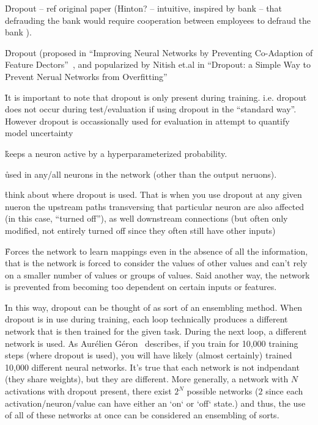 \r{Dropout -- ref original paper (Hinton? -- intuitive, inspired by bank -- that defrauding the bank would require cooperation between employees to defraud the bank )}.

\r{Dropout (proposed in ``Improving Neural Networks by Preventing Co-Adaption of Feature Dectors''~\cite{DBLP:journals/corr/abs-1207-0580}, and popularized by Nitish et.al in ``Dropout: a Simple Way to Prevent Nerual Networks from Overfitting''~\cite{JMLR:v15:srivastava14a}}

\r{It is important to note that dropout is only present during training. i.e. dropout does not occur during test/evaluation if using dropout in the ``standard way''. However dropout is occassionally used for evaluation in attempt to quantify model uncertainty }

\r{keeps a neuron active by a hyperparameterized probability.}

\r{used in any/all neurons in the network (other than the output neruons).}

\r{think about where dropout is used. That is when you use dropout at any given nueron the upstream paths transversing that particular neuron are also affected (in this case, ``turned off''), as well downstream connections (but often only modified, not entirely turned off since they often still have other inputs) }

\r{Forces the network to learn mappings even in the absence of all the information, that is the network is forced to consider the values of other values and can't rely on a smaller number of values or groups of values. Said another way, the network is prevented from becoming too dependent on certain inputs or features.}

\r{In this way, dropout can be thought of as sort of an ensembling method. When dropout is in use during training, each loop technically produces a different network that is then trained for the given task. During the next loop, a different network is used. As Aurélien Géron~\cite{geron2019hands} describes, if you train for 10,000 training steps (where dropout is used), you will have likely (almost certainly) trained 10,000 different neural networks. It's true that each network is not indpendant (they share weights), but they are different. More generally, a network with $N$ activations with dropout present, there exist $2^N$ possible networks ($2$ since each activation/neuron/value can have either an `on` or `off` state.) and thus, the use of all of these networks at once can be considered an ensembling of sorts.}

